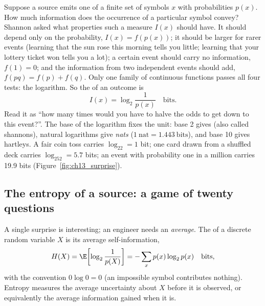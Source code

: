 Suppose a source emits one of a finite set of symbols $x$ with probabilities $p(x)$. How much
information does the occurrence of a particular symbol convey? Shannon asked what properties such
a measure $I(x)$ should have. It should depend only on the probability, $I(x)=f(p(x))$; it
should be larger for rarer events (learning that the sun rose this morning tells you little;
learning that your lottery ticket won tells you a lot); a certain event should carry no
information, $f(1)=0$; and the information from two independent events should add,
$f(pq)=f(p)+f(q)$. Only one family of continuous functions passes all four tests: the
logarithm. So the  of an outcome is
\begin{equation}
I(x)=\log_2\frac{1}{p(x)}\quad\text{bits}.
\label{eq:ch13:selfinfo}
\end{equation}
Read it as ``how many times would you have to halve the odds to get down to this event?''. The
base of the logarithm fixes the unit: base 2 gives  (also called shannons), natural
logarithms give \emph{nats} ($1\ \text{nat}=1.443\ \text{bits}$), and base 10 gives hartleys. A
fair coin toss carries $\log_22=1$ bit; one card drawn from a shuffled deck carries
$\log_252=5.7$ bits; an event with probability one in a million carries 19.9 bits
(Figure~\ref{fig:ch13_surprise}).

\subsection{The entropy of a source: a game of twenty questions}

A single surprise is interesting; an engineer needs an \emph{average}. The  of a
discrete random variable $X$ is its average self-information,
\begin{equation}
H(X)=\E\!\left[\log_2\frac{1}{p(X)}\right]=-\sum_x p(x)\log_2p(x)\quad\text{bits},
\label{eq:ch13:entropy}
\end{equation}
with the convention $0\log0=0$ (an impossible symbol contributes nothing). Entropy measures the
average uncertainty about $X$ before it is observed, or equivalently the average information
gained when it is.

